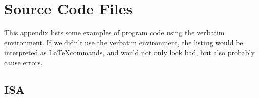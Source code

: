 \chapter{Source Code Files}

This appendix lists some examples of program code using the verbatim
environment.  If we didn't use the verbatim environment, the listing
would be interpreted as \LaTeX commands, and would not only look
bad, but also probably cause errors.

\section{ISA}


